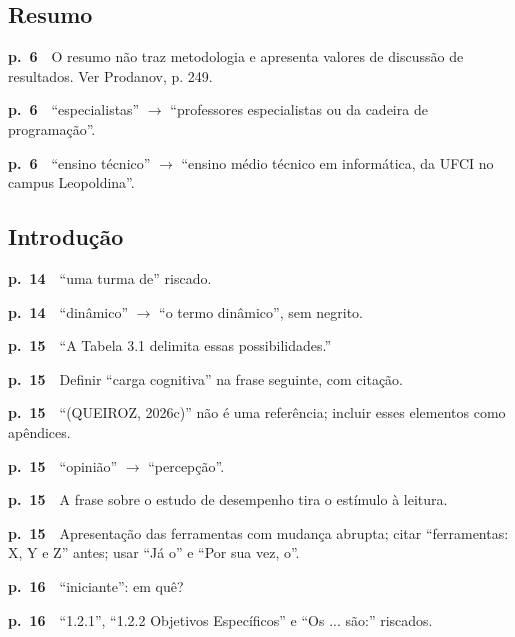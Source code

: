\documentclass[11pt,a4paper]{article}
\newcommand{\pg}[1]{\textbf{p.~#1}\ \ }
\begin{document}
\subsection*{Resumo}
\begin{checklist}
  \item \pg{6}O resumo não traz metodologia e apresenta valores de discussão de resultados. Ver Prodanov, p. 249.
  \item \pg{6}“especialistas” $\rightarrow$ “professores especialistas ou da cadeira de programação”.
  \item \pg{6}“ensino técnico” $\rightarrow$ “ensino médio técnico em informática, da UFCI no campus Leopoldina”.
\end{checklist}
\subsection*{Introdução}
\begin{checklist}
  \item \pg{14}“uma turma de” riscado.
  \item \pg{14}“dinâmico” $\rightarrow$ “o termo dinâmico”, sem negrito.
  \item \pg{15}“A Tabela 3.1 delimita essas possibilidades.”
  \item \pg{15}Definir “carga cognitiva” na frase seguinte, com citação.
  \item \pg{15}“(QUEIROZ, 2026c)” não é uma referência; incluir esses elementos como apêndices.
  \item \pg{15}“opinião” $\rightarrow$ “percepção”.
  \item \pg{15}A frase sobre o estudo de desempenho tira o estímulo à leitura.
  \item \pg{15}Apresentação das ferramentas com mudança abrupta; citar “ferramentas: X, Y e Z” antes; usar “Já o” e “Por sua vez, o”.
  \item \pg{16}“iniciante”: em quê?
  \item \pg{16}“1.2.1”, “1.2.2 Objetivos Específicos” e “Os ... são:” riscados.
\end{checklist}
\end{document}

